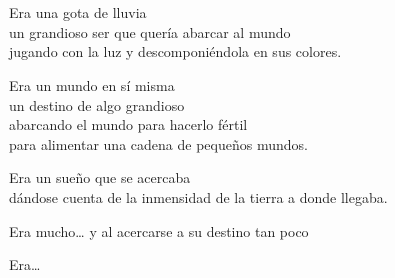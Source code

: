 \begin{lyrics}

\\
\\
Era una gota de lluvia\\
un grandioso ser que quería abarcar al mundo\\
jugando con la luz y descomponiéndola en sus colores.

Era un mundo en sí misma\\
un destino de algo grandioso\\
abarcando el mundo para hacerlo fértil\\
para alimentar una cadena de pequeños mundos.

Era un sueño que se acercaba\\
dándose cuenta de la inmensidad de la tierra a donde llegaba.

Era mucho…  y al acercarse a su destino tan poco

Era…

\\
\end{lyrics}

